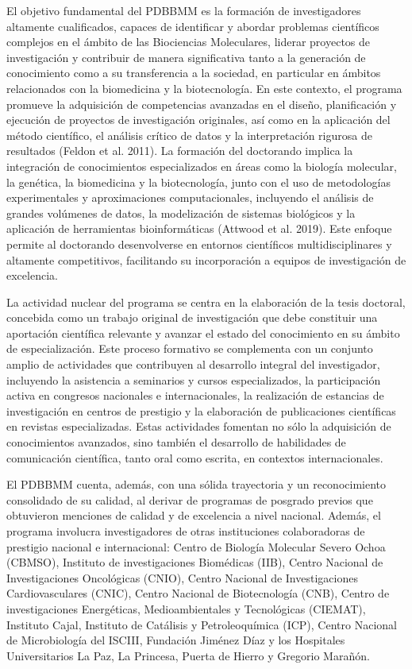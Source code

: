 \documentclass[
  11pt,
  a4paper,
  twoside]{scrreprt}
\begin{document}
El objetivo fundamental del PDBBMM es la formación de investigadores
altamente cualificados, capaces de identificar y abordar problemas
científicos complejos en el ámbito de las Biociencias Moleculares,
liderar proyectos de investigación y contribuir de manera significativa
tanto a la generación de conocimiento como a su transferencia a la
sociedad, en particular en ámbitos relacionados con la biomedicina y la
biotecnología. En este contexto, el programa promueve la adquisición de
competencias avanzadas en el diseño, planificación y ejecución de
proyectos de investigación originales, así como en la aplicación del
método científico, el análisis crítico de datos y la interpretación
rigurosa de resultados (Feldon et al. 2011). La formación del doctorando
implica la integración de conocimientos especializados en áreas como la
biología molecular, la genética, la biomedicina y la biotecnología,
junto con el uso de metodologías experimentales y aproximaciones
computacionales, incluyendo el análisis de grandes volúmenes de datos,
la modelización de sistemas biológicos y la aplicación de herramientas
bioinformáticas (Attwood et al. 2019). Este enfoque permite al
doctorando desenvolverse en entornos científicos multidisciplinares y
altamente competitivos, facilitando su incorporación a equipos de
investigación de excelencia.

La actividad nuclear del programa se centra en la elaboración de la
tesis doctoral, concebida como un trabajo original de investigación que
debe constituir una aportación científica relevante y avanzar el estado
del conocimiento en su ámbito de especialización. Este proceso formativo
se complementa con un conjunto amplio de actividades que contribuyen al
desarrollo integral del investigador, incluyendo la asistencia a
seminarios y cursos especializados, la participación activa en congresos
nacionales e internacionales, la realización de estancias de
investigación en centros de prestigio y la elaboración de publicaciones
científicas en revistas especializadas. Estas actividades fomentan no
sólo la adquisición de conocimientos avanzados, sino también el
desarrollo de habilidades de comunicación científica, tanto oral como
escrita, en contextos internacionales.

El PDBBMM cuenta, además, con una sólida trayectoria y un reconocimiento
consolidado de su calidad, al derivar de programas de posgrado previos
que obtuvieron menciones de calidad y de excelencia a nivel nacional.
Además, el programa involucra investigadores de otras instituciones
colaboradoras de prestigio nacional e internacional: Centro de Biología
Molecular Severo Ochoa (CBMSO), Instituto de investigaciones Biomédicas
(IIB), Centro Nacional de Investigaciones Oncológicas (CNIO), Centro
Nacional de Investigaciones Cardiovasculares (CNIC), Centro Nacional de
Biotecnología (CNB), Centro de investigaciones Energéticas,
Medioambientales y Tecnológicas (CIEMAT), Instituto Cajal, Instituto de
Catálisis y Petroleoquímica (ICP), Centro Nacional de Microbiología del
ISCIII, Fundación Jiménez Díaz y los Hospitales Universitarios La Paz,
La Princesa, Puerta de Hierro y Gregorio Marañón.
\end{document}

